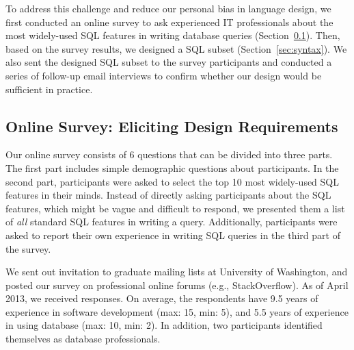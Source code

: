 
To address this challenge and reduce our personal bias
in language design, we first conducted an online survey
to ask experienced IT professionals about the most widely-used
SQL features in writing database queries (Section~\ref{sec:survey}).
Then, based on the survey results, we designed
a SQL subset (Section~\ref{sec:syntax}).  
We also sent the designed SQL subset to the survey participants
and conducted a series of follow-up email interviews
to confirm whether our design would be sufficient in practice.









\subsection{Online Survey: Eliciting Design Requirements}
\label{sec:survey}


Our online survey consists of 6 questions that can be
divided into three parts. The first part includes
simple demographic questions about participants.
In the second part, participants were asked to select
the top 10 most widely-used SQL features in their minds.
Instead of directly asking participants about the SQL
features, which might be vague and difficult to respond,
we presented them a list of \textit{all} standard
SQL features in writing a query.
Additionally, participants were asked to report their 
own experience in writing SQL queries in the third part of the survey.



We sent out invitation to graduate mailing lists at
University of Washington, and posted our survey on
professional online forums (e.g., StackOverflow).
As of April 2013, we received \respnum responses.
On average, the respondents have 9.5 years of experience
in software development (max: 15, min: 5),
and 5.5 years of experience in
using database (max: 10, min: 2). In addition, two
participants identified themselves as database professionals.

